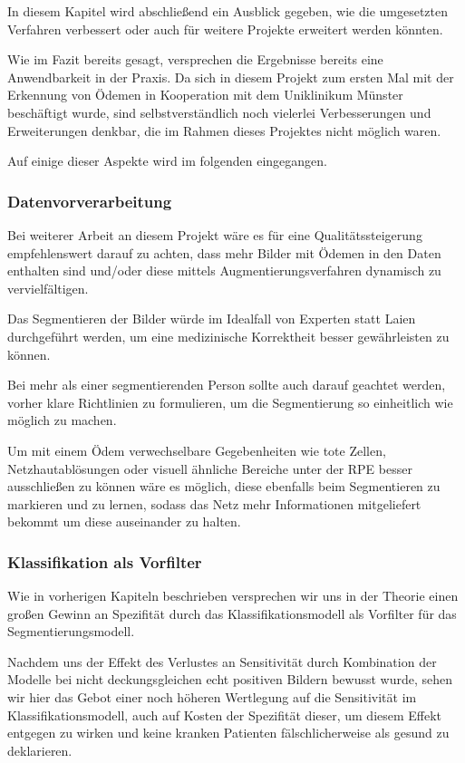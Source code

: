 In diesem Kapitel wird abschließend ein Ausblick gegeben, wie die umgesetzten Verfahren verbessert oder auch für weitere Projekte erweitert werden könnten. 

Wie im Fazit bereits gesagt, versprechen die Ergebnisse bereits eine Anwendbarkeit in der Praxis. Da sich in diesem Projekt zum ersten Mal mit der Erkennung von Ödemen in Kooperation mit dem Uniklinikum Münster beschäftigt wurde, sind selbstverständlich noch vielerlei Verbesserungen und Erweiterungen denkbar, die im Rahmen dieses Projektes nicht möglich waren. 

Auf einige dieser Aspekte wird im folgenden eingegangen. 

\subsubsection{Datenvorverarbeitung}

Bei weiterer Arbeit an diesem Projekt wäre es für eine Qualitätssteigerung empfehlenswert darauf zu achten, dass mehr Bilder mit Ödemen in den Daten enthalten sind und/oder diese mittels Augmentierungsverfahren dynamisch zu vervielfältigen.

Das Segmentieren der Bilder würde im Idealfall von Experten statt Laien durchgeführt werden, um eine medizinische Korrektheit besser gewährleisten zu können.

Bei mehr als einer segmentierenden Person sollte auch darauf geachtet werden, vorher klare Richtlinien zu formulieren, um die Segmentierung so einheitlich wie möglich zu machen.

Um mit einem Ödem verwechselbare Gegebenheiten wie tote Zellen, Netzhautablösungen oder visuell ähnliche Bereiche unter der RPE besser ausschließen zu können wäre es möglich, diese ebenfalls beim Segmentieren zu markieren und zu lernen, sodass das Netz mehr Informationen mitgeliefert bekommt um diese auseinander zu halten.

\subsubsection{Klassifikation als Vorfilter}

Wie in vorherigen Kapiteln beschrieben versprechen wir uns in der Theorie einen großen Gewinn an Spezifität durch das Klassifikationsmodell als Vorfilter für das Segmentierungsmodell.

Nachdem uns der Effekt des Verlustes an Sensitivität durch Kombination der Modelle bei nicht deckungsgleichen echt positiven Bildern bewusst wurde, sehen wir hier das Gebot einer noch höheren Wertlegung auf die Sensitivität im Klassifikationsmodell, auch auf Kosten der Spezifität dieser, um diesem Effekt entgegen zu wirken und keine kranken Patienten fälschlicherweise als gesund zu deklarieren.

